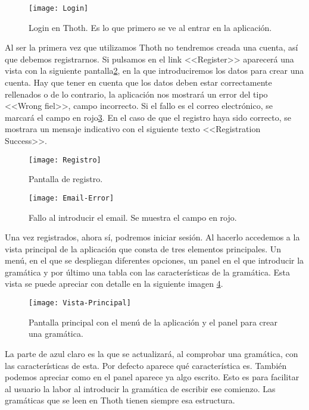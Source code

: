 \begin{figure}[h]
\centering
\texttt{[image: Login]}
\caption{Login en Thoth. Es lo que primero se ve al entrar en la aplicación.}
\label{fig:6.1}
\end{figure}

Al ser la primera vez que utilizamos Thoth no tendremos creada una cuenta, así que debemos registrarnos. Si pulsamos en el link <<Register>> aparecerá una vista con la siguiente pantalla\ref{fig:6.2}, en la que introduciremos los datos para crear una cuenta. Hay que tener en cuenta que los datos deben estar correctamente rellenados o de lo contrario, la aplicación nos mostrará un error del tipo <<Wrong fiel>>, campo incorrecto. Si el fallo es el correo electrónico, se marcará el campo en rojo\ref{fig:6.3}. En el caso de que el registro haya sido correcto, se mostrara un mensaje indicativo con el siguiente texto <<Registration Success>>.

\begin{figure}[h]
\centering
\texttt{[image: Registro]}
\caption{Pantalla de registro.}
\label{fig:6.2}
\end{figure}

\begin{figure}[h]
\centering
\texttt{[image: Email-Error]}
\caption{Fallo al introducir el email. Se muestra el campo en rojo.}
\label{fig:6.3}
\end{figure}

Una vez registrados, ahora sí, podremos iniciar sesión. Al hacerlo accedemos a la vista principal de la aplicación que consta de tres elementos principales. Un menú, en el que se despliegan diferentes opciones, un panel en el que introducir la gramática y por último una tabla con las características de la gramática. Esta vista se puede apreciar con detalle en la siguiente imagen \ref{fig:6.4}.


\begin{figure}[h]
\centering
\texttt{[image: Vista-Principal]}
\caption{Pantalla principal con el menú de la aplicación y el panel para crear una gramática.}
\label{fig:6.4}
\end{figure}

La parte de azul claro es la que se actualizará, al comprobar una gramática, con las características de esta. Por defecto aparece qué característica es. También podemos apreciar como en el panel aparece ya algo escrito. Esto es para facilitar al usuario la labor al introducir la gramática de escribir ese comienzo. Las gramáticas que se leen en Thoth tienen siempre esa estructura. 

